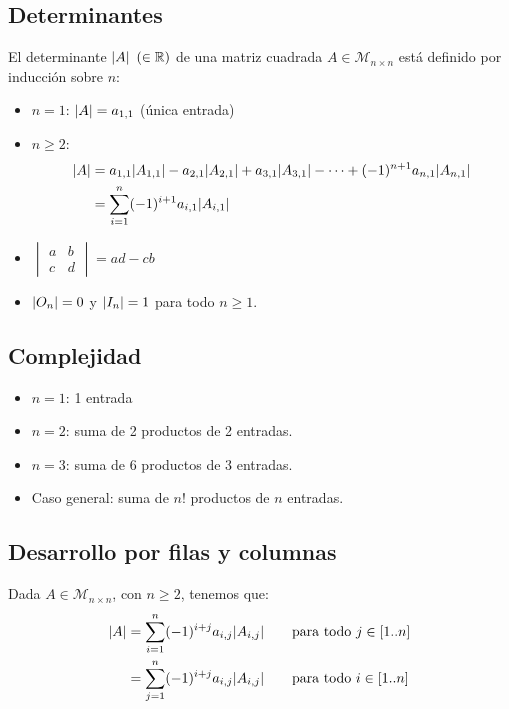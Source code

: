 \documentclass[11pt,a4paper]{article}
\newcommand{\M}{\mathcal{M}}
\begin{document}
\subsection{Determinantes}

\begin{definicion}
El determinante $\lvert A\rvert$ $(\in\mathbb{R})$ de una matriz cuadrada $A\in\M_{n\times n}$ está definido por inducción sobre $n$:
\begin{itemize}
  \item $n=1$: $\lvert A\rvert=a_{1,1}$ (única entrada)
  \item $n\geq2$:
  \begin{align*}
  \lvert A\rvert&=a_{1,1}\lvert A_{1,1}\rvert-a_{2,1}\lvert A_{2,1}\rvert+a_{3,1}\lvert A_{3,1}\rvert-\dots+(-1)^{n+1}a_{n,1}\lvert A_{n,1}\rvert\\
  &=\sum_{i=1}^{n}(-1)^{i+1}a_{i,1}\lvert A_{i,1}\rvert
  \end{align*}
\end{itemize}
\end{definicion}

\begin{itemize}
  \item $\begin{vmatrix}a&b\\c&d\end{vmatrix}=ad-cb$
  \item $\lvert O_n\rvert=0$ y $\lvert I_n\rvert=1$ para todo $n\geq1$.
\end{itemize}

\subsection{Complejidad}

\begin{itemize}
  \item[] $n=1$: 1 entrada
  \item[] $n=2$: suma de 2 productos de 2 entradas.
  \item[] $n=3$: suma de 6 productos de 3 entradas.
  \item[] Caso general: suma de $n!$ productos de $n$ entradas.
\end{itemize}

\subsection{Desarrollo por filas y columnas}

\begin{proposicion}
Dada $A\in\M_{n\times n}$, con $n\geq2$, tenemos que:
\begin{align*}
\lvert A\rvert&=\sum_{i=1}^{n}(-1)^{i+j}a_{i,j}\lvert A_{i,j}\rvert\qquad\text{para todo } j\in[1..n]\\
&=\sum_{j=1}^{n}(-1)^{i+j}a_{i,j}\lvert A_{i,j}\rvert\qquad\text{para todo } i\in[1..n]
\end{align*}
\end{proposicion}
\end{document}
